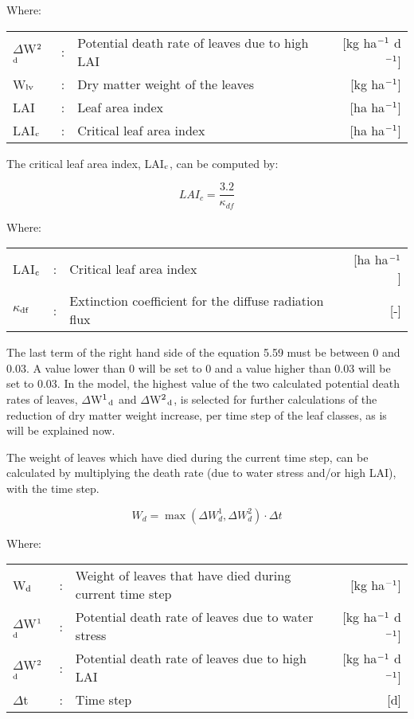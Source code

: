 Where:\\[5pt]
\begin{tabularx}{\textwidth}{llXr}
$\Delta$W$^{{\rm 2}}$$_{{\rm d}}$ &:& Potential death rate of leaves due to 
    high LAI   &    [kg ha$^{{\rm -1}}$ d$^{{\rm -1}}$]\\
W$_{{\rm lv}}$ &:& Dry matter weight of the leaves  &  [kg ha$^{{\rm -1}}$]\\
LAI &:& Leaf area index   &    [ha ha$^{{\rm -1}}$]\\
LAI$_{{\rm c}}$ &:& Critical leaf area index   &     [ha ha$^{{\rm -1}}$]\\
\end{tabularx}

The critical leaf area index, LAI$_{{\rm c}}$,  can be computed by:

\begin{equation}
LAI_{c} = {\frac{3.2}{\kappa_{df} }}
\end{equation}

Where:\\[5pt]
\begin{tabularx}{\textwidth}{llXr}
LAI$_{{\rm c}}$ &:& Critical leaf area index    &    [ha ha$^{{\rm -1}}$]\\
$\kappa$$_{{\rm df}}$ &:& Extinction coefficient for 
    the diffuse radiation flux   &    [-]\\
\end{tabularx}

The last term of the right hand side of the equation 5.59 must be between 0 and 0.03. A 
value lower than 0 will be set to 0 and a value higher than 0.03 will be set to 0.03. In the
model, the highest value of the two calculated potential death rates of leaves, 
$\Delta$W$^{{\rm 1}}$$_{{\rm d}}$ and $\Delta$W$^{{\rm 2}}$$_{{\rm d}}$, is selected 
for further calculations of the reduction of dry matter weight increase,
per time step of the leaf classes, as is will be explained now. 

The weight of leaves which have died during the current time step, can be calculated by
multiplying the death rate (due to water stress and/or high LAI), with the time step.

\begin{equation}
W_{d} = \max(\Delta W_{d}^{1} , \Delta W_{d}^{2})\cdot \Delta t
\end{equation}

Where:\\[5pt]
\begin{tabularx}{\textwidth}{llXr}
W$_{{\rm d}}$ &:& Weight of leaves that have died during 
    current time step    &    [kg ha$^{{\rm -1}}$]\\
$\Delta$W$^{{\rm 1}}$$_{{\rm d}}$ &:& Potential death rate of leaves due 
    to water stress   &      [kg ha$^{{\rm -1}}$ d$^{{\rm -1}}$]\\
$\Delta$W$^{{\rm 2}}$$_{{\rm d}}$ &:& Potential death rate of leaves due to 
    high LAI   &     [kg ha$^{{\rm -1}}$ d$^{{\rm -1}}$]\\
$\Delta$t &:& Time step    &    [d]\\
\end{tabularx}


